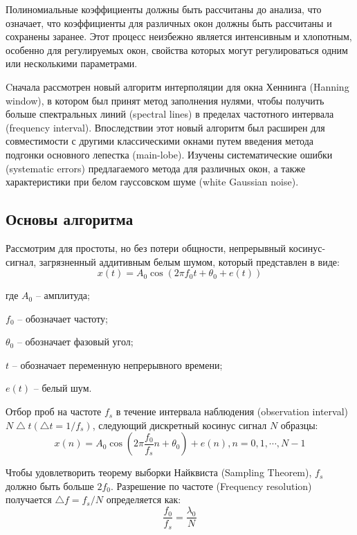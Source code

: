 Полиномиальные коэффициенты должны быть рассчитаны до анализа, что означает, что коэффициенты для различных окон должны быть рассчитаны и сохранены заранее. Этот процесс неизбежно является интенсивным и хлопотным, особенно для регулируемых окон, свойства которых могут регулироваться одним или несколькими параметрами.

Cначала рассмотрен новый алгоритм интерполяции для окна Хеннинга (Hanning window), в котором был принят метод заполнения нулями, чтобы получить больше спектральных линий (spectral lines) в пределах частотного интервала (frequency interval). Впоследствии этот новый алгоритм был расширен для совместимости с другими классическими окнами путем введения метода подгонки основного лепестка (main-lobe). Изучены систематические ошибки (systematic errors) предлагаемого метода для различных окон, а также характеристики при белом гауссовском шуме (white Gaussian noise).

\subsection{Основы алгоритма} \label{sec:ch2/sec5_1}

Рассмотрим для простоты, но без потери общности, непрерывный косинус-сигнал, загрязненный аддитивным белым шумом, который представлен в виде:
\begin{equation}
\label{eq:equation12}
x(t) = A_0 \cos(2 \pi f_0 t + \theta_0 + e(t))
\end{equation}

где $A_0$ – амплитуда;

$f_0$ – обозначает частоту;

$\theta_0$ – обозначает фазовый угол;

$t$ – обозначает переменную непрерывного времени;

$e(t)$ – белый шум. 

Отбор проб на частоте $f_s$ в течение интервала наблюдения (observation interval) $N\bigtriangleup t(\bigtriangleup t=1/f_s )$, следующий дискретный косинус сигнал $N$ образцы:
\begin{equation}
\label{eq:equation13}
x(n) = A_0 \cos(2 \pi \frac{f_0}{f_s} n + \theta_0) + e(n), n = 0,1, \cdots , N-1
\end{equation}

Чтобы удовлетворить теорему выборки Найквиста (Sampling Theorem), $f_s$ должно быть больше $2f_0$. Разрешение по частоте (Frequency resolution) получается $\bigtriangleup f=f_s/N$ определяется как:
\begin{equation}
\label{eq:equation14}
\frac{f_0}{f_s}=\frac{\lambda_0}{N}
\end{equation}

